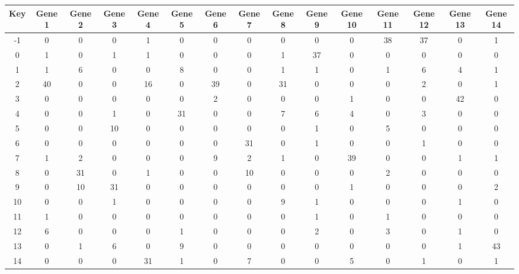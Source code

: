 \begin{tabular}{|c|c|c|c|c|c|c|c|c|c|c|c|c|c|c|}
\hline
Key & Gene 1 & Gene 2 & Gene 3 & Gene 4 & Gene 5 & Gene 6 & Gene 7 & Gene 8 & Gene 9 & Gene 10 & Gene 11 & Gene 12 & Gene 13 & Gene 14 \\
\hline
-1 & 0 & 0 & 0 & 1 & 0 & 0 & 0 & 0 & 0 & 0 & 38 & 37 & 0 & 1 \\
0 & 1 & 0 & 1 & 1 & 0 & 0 & 0 & 1 & 37 & 0 & 0 & 0 & 0 & 0 \\
1 & 1 & 6 & 0 & 0 & 8 & 0 & 0 & 1 & 1 & 0 & 1 & 6 & 4 & 1 \\
2 & 40 & 0 & 0 & 16 & 0 & 39 & 0 & 31 & 0 & 0 & 0 & 2 & 0 & 1 \\
3 & 0 & 0 & 0 & 0 & 0 & 2 & 0 & 0 & 0 & 1 & 0 & 0 & 42 & 0 \\
4 & 0 & 0 & 1 & 0 & 31 & 0 & 0 & 7 & 6 & 4 & 0 & 3 & 0 & 0 \\
5 & 0 & 0 & 10 & 0 & 0 & 0 & 0 & 0 & 1 & 0 & 5 & 0 & 0 & 0 \\
6 & 0 & 0 & 0 & 0 & 0 & 0 & 31 & 0 & 1 & 0 & 0 & 1 & 0 & 0 \\
7 & 1 & 2 & 0 & 0 & 0 & 9 & 2 & 1 & 0 & 39 & 0 & 0 & 1 & 1 \\
8 & 0 & 31 & 0 & 1 & 0 & 0 & 10 & 0 & 0 & 0 & 2 & 0 & 0 & 0 \\
9 & 0 & 10 & 31 & 0 & 0 & 0 & 0 & 0 & 0 & 1 & 0 & 0 & 0 & 2 \\
10 & 0 & 0 & 1 & 0 & 0 & 0 & 0 & 9 & 1 & 0 & 0 & 0 & 1 & 0 \\
11 & 1 & 0 & 0 & 0 & 0 & 0 & 0 & 0 & 1 & 0 & 1 & 0 & 0 & 0 \\
12 & 6 & 0 & 0 & 0 & 1 & 0 & 0 & 0 & 2 & 0 & 3 & 0 & 1 & 0 \\
13 & 0 & 1 & 6 & 0 & 9 & 0 & 0 & 0 & 0 & 0 & 0 & 0 & 1 & 43 \\
14 & 0 & 0 & 0 & 31 & 1 & 0 & 7 & 0 & 0 & 5 & 0 & 1 & 0 & 1 \\
\hline
\end{tabular}